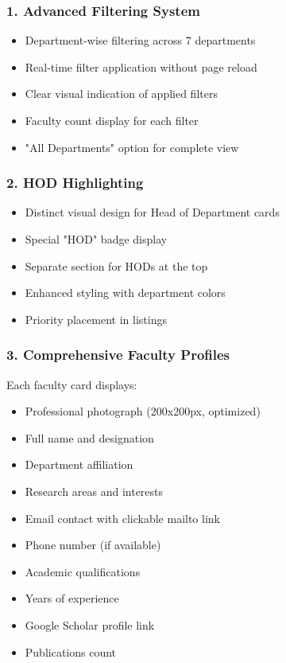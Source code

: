 \documentclass[12pt,a4paper]{report}
\begin{document}
\subsubsection*{1. Advanced Filtering System}
\begin{itemize}
    \item Department-wise filtering across 7 departments
    \item Real-time filter application without page reload
    \item Clear visual indication of applied filters
    \item Faculty count display for each filter
    \item "All Departments" option for complete view
\end{itemize}

\subsubsection*{2. HOD Highlighting}
\begin{itemize}
    \item Distinct visual design for Head of Department cards
    \item Special "HOD" badge display
    \item Separate section for HODs at the top
    \item Enhanced styling with department colors
    \item Priority placement in listings
\end{itemize}

\subsubsection*{3. Comprehensive Faculty Profiles}
Each faculty card displays:
\begin{itemize}
    \item Professional photograph (200x200px, optimized)
    \item Full name and designation
    \item Department affiliation
    \item Research areas and interests
    \item Email contact with clickable mailto link
    \item Phone number (if available)
    \item Academic qualifications
    \item Years of experience
    \item Google Scholar profile link
    \item Publications count
\end{itemize}
\end{document}
